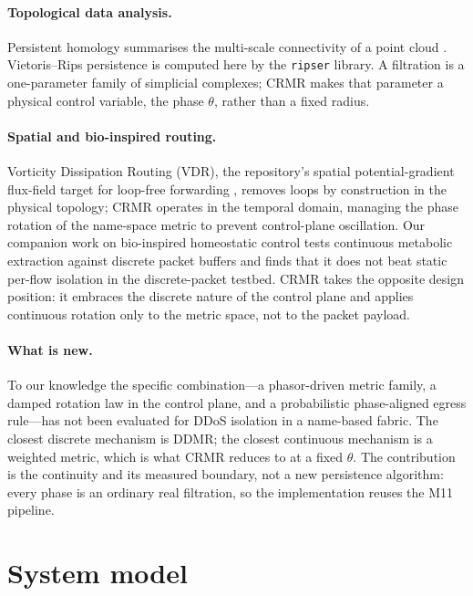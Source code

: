 \documentclass[10pt,a4paper]{article}
\begin{document}
\paragraph{Topological data analysis.}
Persistent homology summarises the multi-scale connectivity of a point cloud
\cite{edelsbrunner2002}. Vietoris--Rips persistence is computed here by the
\texttt{ripser} library. A filtration is a one-parameter family of simplicial
complexes; CRMR makes that parameter a physical control variable, the phase
$\theta$, rather than a fixed radius.

\paragraph{Spatial and bio-inspired routing.}
Vorticity Dissipation Routing (VDR), the repository's spatial potential-gradient
flux-field target for loop-free forwarding \cite{vdr}, removes loops by
construction in the physical topology; CRMR operates in the temporal domain,
managing the phase rotation of the name-space metric to prevent control-plane
oscillation. Our companion work on bio-inspired homeostatic control \cite{paperb}
tests continuous metabolic extraction against discrete packet buffers and finds
that it does not beat static per-flow isolation in the discrete-packet testbed.
CRMR takes the opposite design position: it embraces the discrete nature of the
control plane and applies continuous rotation only to the metric space, not to
the packet payload.

\paragraph{What is new.}
To our knowledge the specific combination---a phasor-driven metric family, a
damped rotation law in the control plane, and a probabilistic phase-aligned egress
rule---has not been evaluated for DDoS isolation in a name-based fabric. The
closest discrete mechanism is DDMR; the closest continuous mechanism is a weighted
metric, which is what CRMR reduces to at a fixed $\theta$. The contribution is the
continuity and its measured boundary, not a new persistence algorithm: every phase
is an ordinary real filtration, so the implementation reuses the M11 pipeline.

\section{System model}
\label{sec:model}
\end{document}
